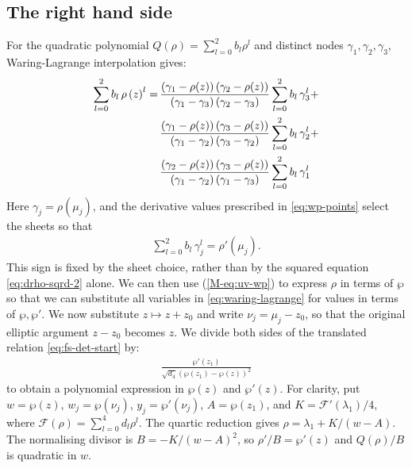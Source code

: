 \documentclass[11pt,a4paper]{article}
\newcommand{\externaleqref}[1]{\textup{(\ref*{#1})}}
\begin{document}
\subsection{The right hand side}
For the quadratic polynomial $Q(\rho)=\sum_{l=0}^{2}b_l\rho^l$ and distinct nodes $\gamma_1,\gamma_2,\gamma_3$, Waring-Lagrange interpolation gives:
\begin{align}
\sum_{l=0}^{2}b_l\,\rho\left(z\right)^l =\, &\frac{\left({\gamma}_{1} - \rho{\left(z \right)}\right) \left({\gamma}_{2} - \rho{\left(z \right)}\right)}{\left({\gamma}_{1} - {\gamma}_{3}\right) \left({\gamma}_{2} - {\gamma}_{3}\right)} \sum\limits_{l=0}^{2}b_l\,\gamma_3^l + \notag \\
&\frac{\left({\gamma}_{1} - \rho{\left(z \right)}\right) \left({\gamma}_{3} - \rho{\left(z \right)}\right)}{\left({\gamma}_{1} - {\gamma}_{2}\right) \left({\gamma}_{3} - {\gamma}_{2}\right)} \sum\limits_{l=0}^{2}b_l\,\gamma_2^l + \notag \\
&\frac{\left({\gamma}_{2} - \rho{\left(z \right)}\right) \left({\gamma}_{3} - \rho{\left(z \right)}\right)}{\left({\gamma}_{1} - {\gamma}_{2}\right) \left({\gamma}_{1} - {\gamma}_{3}\right)} \sum\limits_{l=0}^{2}b_l\,\gamma_1^l \label{eq:waring-lagrange}
\end{align}
Here $\gamma_j=\rho(\mu_j)$, and the derivative values prescribed in \eqref{eq:wp-points} select the sheets so that
\begin{align}
\sum\limits_{l=0}^{2}b_l\,\gamma_j^l = \rho'\left(\mu_j\right).
\end{align}
This sign is fixed by the sheet choice, rather than by the squared equation \eqref{eq:drho-sqrd-2} alone.
We can then use \externaleqref{M-eq:uv-wp} to express $\rho$ in terms of $\wp$ so that we can substitute all variables in \eqref{eq:waring-lagrange} for values in terms of $\wp, \wp'$.
We now substitute $z\mapsto z+z_0$ and write $\nu_j=\mu_j-z_0$, so that the original elliptic argument $z-z_0$ becomes $z$.
We divide both sides of the translated relation \eqref{eq:fs-det-start} by:
\begin{align}
\frac{\wp'{\left(z_{1}\right)}}{\sqrt{{d}_{4}} \left(\wp{\left(z_{1}\right)} - \wp{\left(z\right)}\right)^2 }
\end{align}
to obtain a polynomial expression in $\wp(z)$ and $\wp'(z)$.
For clarity, put $w=\wp(z)$, $w_j=\wp(\nu_j)$, $y_j=\wp'(\nu_j)$,
$A=\wp(z_1)$, and $K=\mathcal F'(\lambda_1)/4$, where $\mathcal F(\rho)=\sum_{l=0}^4d_l\rho^l$.
The quartic reduction gives $\rho=\lambda_1+K/(w-A)$.
The normalising divisor is $B=-K/(w-A)^2$, so $\rho'/B=\wp'(z)$ and $Q(\rho)/B$ is quadratic in $w$.
\end{document}
